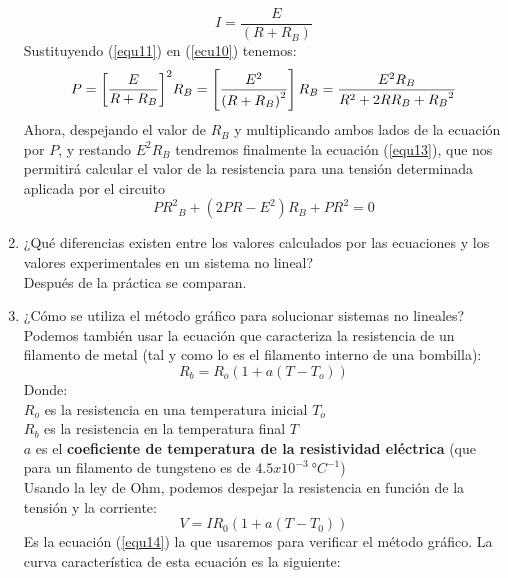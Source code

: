 \documentclass[twocolumn]{IEEEtran}
\begin{document}
\begin{enumerate}
\begin{equation}
 I = \frac{E}{(R + R_B)}
\label{equ11}
\end{equation}
\noindent
Sustituyendo (\ref{equ11}) en (\ref{ecu10}) tenemos:
\begin{equation}
\footnotesize{
 P = {\left[ {\frac{E}{{R + {R_B}}}} \right]^2}{R_B} = \left[ {\frac{{{E^2}}}{{{{\left( {R + {R_B}} \right)}^2}}}} \right]{R_B} = \frac{{{E^2}{R_B}}}{{{R^2} + 2R{R_B} + {R_B}^2}}}
\label{equ12}
\end{equation}
\noindent
Ahora, despejando el valor de $R_B$ y multiplicando ambos lados de la ecuación por $P$, y restando $E^2R_B$ tendremos finalmente la ecuación (\ref{equ13}), que nos permitirá calcular el valor de la resistencia para una tensión determinada aplicada por el circuito
\begin{equation}
 P{R^2}_B + \left( {2PR - {E^2}} \right){R_B} + P{R^2} = 0
\label{equ13}
\end{equation}
 \item ¿Qué diferencias existen entre los valores calculados por las ecuaciones y los valores experimentales en un sistema no lineal?\\
Después de la práctica se comparan.
 \item ¿Cómo se utiliza el método gráfico para solucionar sistemas no lineales?\\
Podemos también usar la ecuación que caracteriza la resistencia de un filamento de metal (tal y como lo es el filamento interno de una bombilla):
\begin{equation}
 R_b = R_o(1+a(T-T_o))
\label{equ10}
\end{equation}
\noindent
Donde:\\
$R_o$ es la resistencia en una temperatura inicial $T_o$\\
$R_b$ es la resistencia en la  temperatura final $T$\\
$a$ es el \textbf{coeficiente de temperatura de la resistividad eléctrica} (que para un filamento de tungsteno es de $4.5 x 10^{-3} \ °C^{-1}$)\\
Usando la ley de Ohm, podemos despejar la resistencia en función de la tensión  y la corriente:
\begin{equation}
 V = I{R_0}\left( {1 + a\left( {T - {T_0}} \right)} \right)
\label{equ14}
\end{equation}
\noindent
Es la ecuación (\ref{equ14}) la que usaremos para verificar  el método gráfico. La curva característica de esta ecuación es la siguiente:
\begin{figure}[H]

\end{figure}
\end{enumerate}
\end{document}

